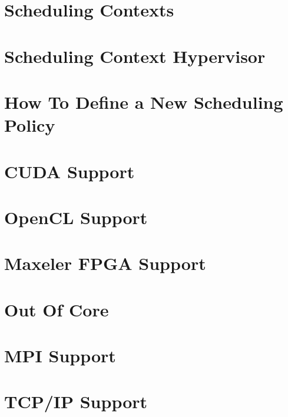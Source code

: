 \chapter{Scheduling Contexts}
\label{SchedulingContexts}
\hypertarget{SchedulingContexts}{}


\chapter{Scheduling Context Hypervisor}
\label{SchedulingContextHypervisor}
\hypertarget{SchedulingContextHypervisor}{}


\chapter{How To Define a New Scheduling Policy}
\label{HowToDefineANewSchedulingPolicy}
\hypertarget{HowToDefineANewSchedulingPolicy}{}


\chapter{CUDA Support}
\label{CUDASupport}
\hypertarget{CUDASupport}{}


\chapter{OpenCL Support}
\label{OpenCLSupport}
\hypertarget{OpenCLSupport}{}


\chapter{Maxeler FPGA Support}
\label{MaxFPGASupport}
\hypertarget{MaxFPGASupport}{}


\chapter{Out Of Core}
\label{OutOfCore}
\hypertarget{OutOfCore}{}


\chapter{MPI Support}
\label{MPISupport}
\hypertarget{MPISupport}{}


\chapter{TCP/IP Support}
\label{TCPIPSupport}
\hypertarget{TCPIPSupport}{}


